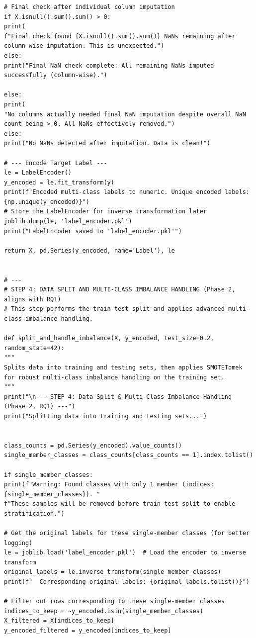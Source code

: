 \begin{lstlisting}[caption={Complete pipeline of XGBoost using CIC-IDS2017 in NIDS using Python}, label={lst:python-pipeline}]
# Final check after individual column imputation
if X.isnull().sum().sum() > 0:
print(
f"Final check found {X.isnull().sum().sum()} NaNs remaining after column-wise imputation. This is unexpected.")
else:
print("Final NaN check complete: All remaining NaNs imputed successfully (column-wise).")

else:
print(
"No columns actually needed final NaN imputation despite overall NaN count being > 0. All NaNs effectively removed.")
else:
print("No NaNs detected after imputation. Data is clean!")

# --- Encode Target Label ---
le = LabelEncoder()
y_encoded = le.fit_transform(y)
print(f"Encoded multi-class labels to numeric. Unique encoded labels: {np.unique(y_encoded)}")
# Store the LabelEncoder for inverse transformation later
joblib.dump(le, 'label_encoder.pkl')
print("LabelEncoder saved to 'label_encoder.pkl'")

return X, pd.Series(y_encoded, name='Label'), le


# ---
# STEP 4: DATA SPLIT AND MULTI-CLASS IMBALANCE HANDLING (Phase 2, aligns with RQ1)
# This step performs the train-test split and applies advanced multi-class imbalance handling.

def split_and_handle_imbalance(X, y_encoded, test_size=0.2, random_state=42):
"""
Splits data into training and testing sets, then applies SMOTETomek
for robust multi-class imbalance handling on the training set.
"""
print("\n--- STEP 4: Data Split & Multi-Class Imbalance Handling (Phase 2, RQ1) ---")
print("Splitting data into training and testing sets...")


class_counts = pd.Series(y_encoded).value_counts()
single_member_classes = class_counts[class_counts == 1].index.tolist()

if single_member_classes:
print(f"Warning: Found classes with only 1 member (indices: {single_member_classes}). "
f"These samples will be removed before train_test_split to enable stratification.")

# Get the original labels for these single-member classes (for better logging)
le = joblib.load('label_encoder.pkl')  # Load the encoder to inverse transform
original_labels = le.inverse_transform(single_member_classes)
print(f"  Corresponding original labels: {original_labels.tolist()}")

# Filter out rows corresponding to these single-member classes
indices_to_keep = ~y_encoded.isin(single_member_classes)
X_filtered = X[indices_to_keep]
y_encoded_filtered = y_encoded[indices_to_keep]


\end{lstlisting}
